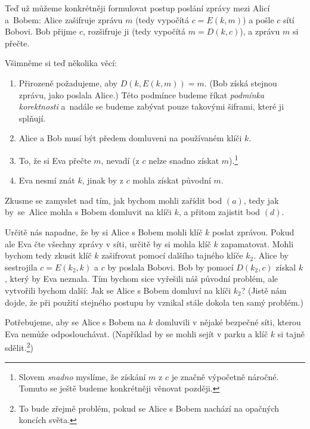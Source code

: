 \documentclass[
  program=infoi,
  biblatex=false,
  figures=true,
  glossaries,
  tables=false,
  sourcecodes=true,
  index
]{kidiplom}
\begin{document}
    
    Teď už můžeme konkrétněji formulovat postup poslání zprávy mezi Alicí a~Bobem:
    Alice zašifruje zprávu $m$ (tedy vypočítá $c=E(k,m)$) a pošle $c$ sítí Bobovi.
    Bob přijme $c$, rozšifruje ji (tedy vypočítá $m=D(k,c)$), a zprávu $m$ si přečte.

    \medskip
    \noindent
    Všimněme si teď několika věcí:
    
    \begin{enumerate}[label=(\alph*)]
        \item
            Přirozeně požadujeme, aby $D(k, E(k, m))=m$.
            (Bob získá stejnou zprávu, jako poslala Alice.)
            Této podmínce budeme říkat \emph{podmínka korektnosti} a~nadále se budeme
            zabývat pouze takovými šiframi, které ji splňují.
        \item
            Alice a Bob musí být předem domluveni na používaném klíči $k$.
        \item
            To, že si Eva přečte $m$, nevadí (z $c$ nelze snadno získat $m$).\footnote{Slovem \emph{snadno} myslíme, že získání
            $m$ z $c$ je značně výpočetně náročné. Tomuto se ještě budeme konkrétněji věnovat později.}
        \item
            Eva nesmí znát $k$, jinak by z $c$ mohla získat původní $m$.
    \end{enumerate}

    Zkusme se zamyslet nad tím, jak bychom mohli zařídit bod $(a)$, tedy jak by~se~Alice mohla s Bobem
    domluvit na klíči $k$, a přitom zajistit bod $(d)$.

    Určitě nás napadne, že by si Alice s Bobem mohli klíč $k$ poslat zprávou.
    Pokud ale Eva čte všechny zprávy v síti, určitě by si mohla klíč $k$ zapamatovat.
    Mohli bychom tedy zkusit klíč $k$ zašifrovat pomocí dalšího tajného klíče $k_2$.
    Alice by sestrojila $c = E(k_2, k)$ a $c$ by poslala Bobovi.
    Bob by pomocí $D(k_2, c)$ získal $k$, který by Eva neznala.
    Tím bychom sice vyřešili náš původní problém, ale vytvořili bychom další: Jak se Alice s Bobem domluví
    na klíči $k_2$? (Jistě nám dojde, že při použití stejného postupu by vznikal stále dokola ten samý problém.)
    
    Potřebujeme, aby se Alice s Bobem na $k$ domluvili v nějaké bezpečné síti, kterou Eva nemůže odposlouchávat.
    (Například by se mohli sejít v parku a klíč $k$ si tajně sdělit.\footnote{To bude zřejmě problém, pokud se Alice s Bobem
    nachází na opačných koncích světa.})
\end{document}

